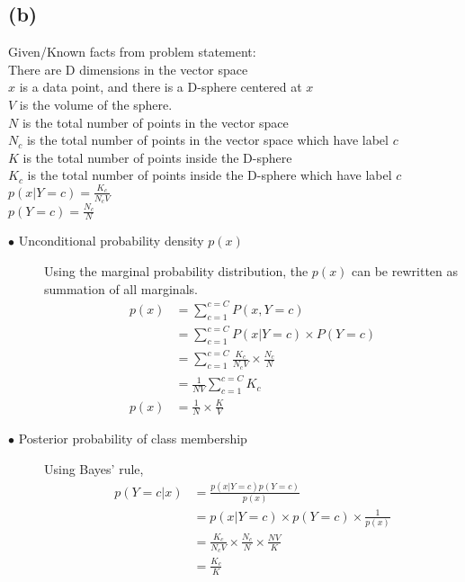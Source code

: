 \documentclass[letterpaper,doc,notimes]{apa6}
\begin{document}
\subsection{(b)}
Given/Known facts from problem statement:
\\ There are D dimensions in the vector space
\\ $x$ is a data point, and there is a D-sphere centered at $x$
\\  $V$ is the volume of the sphere.
\\ $N$ is the total number of points in the vector space
\\ $N_c$ is the total number of points in the vector space which have label $c$
\\ $K$ is the total number of points inside the D-sphere
\\ $K_c$ is the total number of points inside the D-sphere which have label $c$
\\ $p(x | Y = c) = \frac{K_c}{N_c V}$
\\ $p(Y = c) = \frac{N_c}{N}$


\begin{description}
	\item[$\bullet$ Unconditional probability density $p(x)$] 
	Using the marginal probability distribution, the $p(x)$ can be rewritten as summation of all marginals.
	\begin{align*}
		p(x) & = \sum_{c=1}^{c=C} P(x, Y=c) \\
			 & = \sum_{c=1}^{c=C} P(x | Y=c) \times P(Y=c) \\
			 & = \sum_{c=1}^{c=C} \frac{K_c}{N_c V} \times \frac{N_c}{N} \\
			 & = \frac{1}{N V}\sum_{c=1}^{c=C} K_c \\
		p(x) & = \frac{1}{N} \times \frac{K}{V}
	\end{align*}

	\item[$\bullet$ Posterior probability of class membership]
	
	Using Bayes' rule, 
	\begin{align*}
		p(Y=c|x) & = \frac{p(x | Y=c) p(Y=c) }{p(x)}\\
	 		& = p(x | Y=c) \times p(Y=c) \times \frac{1}{p(x)} \\
			& = \frac{K_c}{N_c V} \times \frac{N_c}{N} \times \frac{NV}{K} \\
			& = \frac{K_c}{K}
	\end{align*}
\end{description}
\end{document}
